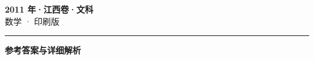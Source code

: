 \documentclass[zihao=5, a4paper]{ctexart}
\begin{document}
\begin{center}
  {\Large\bfseries 2011 年·江西卷·文科}\\[4pt]
  {\large 数学 · 印刷版}
\end{center}
\medskip
{}

\par\bigskip\hrule\bigskip
{}
\begin{center}{\large\bfseries 参考答案与详细解析}\end{center}
\smallskip

\end{document}
